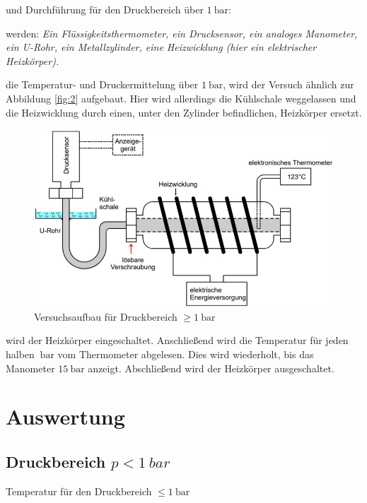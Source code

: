 \justifying und Durchführung für den Druckbereich über $\SI{1}{\bar}$:

\justifying werden: \textit{Ein Flüssigkeitsthermometer, ein Drucksensor, ein analoges Manometer, ein U-Rohr, ein Metallzylinder, eine Heizwicklung 
(hier ein elektrischer Heizkörper).}

\justifying die Temperatur- und Druckermittelung über $\SI{1}{\bar}$, wird der Versuch ähnlich zur Abbildung \ref{fig:2} aufgebaut. 
Hier wird allerdings die Kühlschale weggelassen und die Heizwicklung durch einen, unter den Zylinder befindlichen, Heizkörper ersetzt. 

\begin{figure}[H]
    \centering
    \includegraphics[width=\linewidth]{./images/g1bar.jpg}
    \caption{Versuchsaufbau für Druckbereich $\geq \SI{1}{\bar}$ \cite{V203}}
    \label{fig:3}
\end{figure}

\justifying wird der Heizkörper eingeschaltet. Anschließend wird die Temperatur für jeden halben $\SI{}{\bar}$ vom Thermometer
abgelesen. Dies wird wiederholt, bis das Manometer $\SI{15}{\bar}$ anzeigt. Abschließend wird der Heizkörper ausgeschaltet.


\section{Auswertung}

\subsection{Druckbereich $p < \SI{1}{bar}$}
\begin{table}
    \centering
    
    \caption{Temperatur für den Druckbereich $\leq \SI{1}{\bar}$}
    \label{tab:1}
\end{table}

